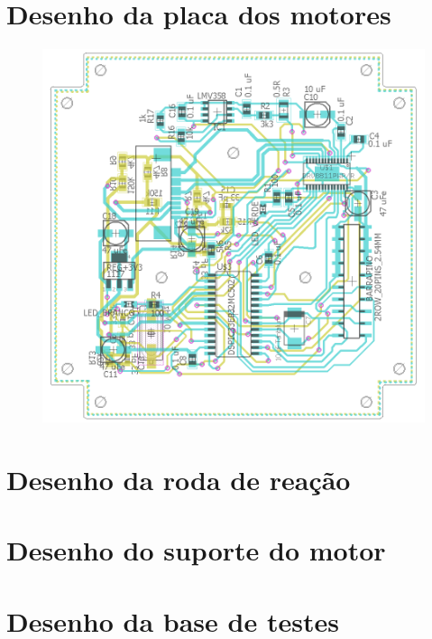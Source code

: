 \documentclass[
	12pt,				%
	openany,			%
	twoside,			%
	a4paper,			%
	english,			%
	french,				%
	spanish,			%
	brazil,				%
	oldfontcommands
	]{abntex2}
\begin{document}
\begin{apendicesenv}
\chapter{Desenho da placa dos motores}

\begin{figure}[th]
	\centering
	\includegraphics[width=1\linewidth]{./figs/Placa_motores}
\end{figure}

\label{ap:PMotor}

\chapter{Desenho da roda de reação}



\label{ap:RW}

\chapter{Desenho do suporte do motor}



\label{ap:MS}

\chapter{Desenho da base de testes}

%
%
%
%

\label{ap:TB}

\end{apendicesenv}
\end{document}

